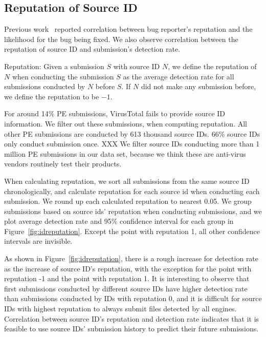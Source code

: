 \subsection{Reputation of Source ID}
\label{sec:reputation}

Previous work~\cite{GuoICSE2010} reported correlation between bug reporter’s reputation and the likelihood for the bug being fixed. 
We also observe correlation between the reputation of source ID and submission’s detection rate. 

\begin{definition}{Reputation:}
Given a submission $S$ with source ID $N$, 
we define the reputation of $N$ when conducting the submission $S$ as the average detection rate for all submissions conducted by $N$ before $S$. 
If $N$ did not make any submission before, we define the reputation to be $-1$. 
\end{definition}

For around 14\% PE submissions, VirusTotal fails to provide source ID information. 
We filter out these submissions, when computing reputation.
All other PE submissions are conducted by 613 thousand source IDs. 
66\% source IDs only conduct submission once. 
XXX
We filter source IDs conducting more than 1 million PE submissions in our data set, 
because we think these are anti-virus vendors routinely test their products. 

When calculating reputation, we sort all submissions from the same source ID chronologically, 
and calculate reputation for each source id when conducting each submission. 
We round up each calculated reputation to nearest 0.05. 
We group submissions based on source ids' reputation when conducting submissions, 
and we plot average detection rate and 95\% confidence interval for each group in Figure~\ref{fig:idreputation}. 
Except the point with reputation 1, all other confidence intervals are invisible.  

As shown in Figure~\ref{fig:idreputation}, 
there is a rough increase for detection rate as the increase of source ID's reputation, 
with the exception for the point with reputation -1 and the point with reputation 1. 
It is interesting to observe that first submissions conducted by different source IDs have higher 
detection rate than submissions conducted by IDs with reputation 0, 
and it is difficult for source IDs with highest reputation to always submit files detected by all engines. 
Correlation between source ID's reputation and detection rate indicates 
that it is feasible to use source IDs' submission history to predict their future submissions.


